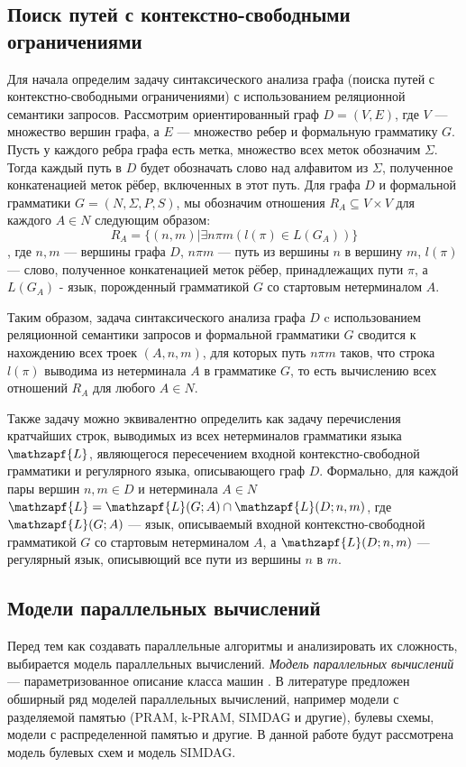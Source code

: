 \documentclass{spbau-diploma}
\begin{document}
\subsection{Поиск путей с контекстно-свободными ограничениями}
Для начала определим задачу синтаксического анализа графа (поиска путей с контекстно-свободными ограничениями) с
использованием реляционной семантики запросов.
Рассмотрим ориентированный граф $D = (V, E)$, где $V$ --- множество вершин графа, а $E$ --- множество ребер и
формальную грамматику $G$. Пусть у каждого ребра графа есть
метка, множество всех меток обозначим $\Sigma$. Тогда каждый путь в
$D$ будет обозначать слово над алфавитом из $\Sigma$, полученное
конкатенацией меток рёбер, включенных в этот путь.
Для графа $D$ и формальной грамматики $G = (N, \Sigma, P, S)$, мы
обозначим отношения $R_A \subseteq V\times V$ для каждого $A \in N$ следующим
образом:
\begin{equation}
R_A = \{(n, m) | \exists n\pi m(l(\pi) \in L(G_A)) \}
\end{equation},
где $n, m$ --- вершины графа $D$, $n\pi m$ --- путь из вершины $n$ в вершину $m$, $l(\pi)$ --- слово, полученное
конкатенацией меток рёбер, принадлежащих пути $\pi$, а $L(G_A)$ - язык, порожденный грамматикой $G$ со стартовым нетерминалом $A$.\par
Таким образом, задача синтаксического анализа графа $D$ c
использованием реляционной семантики запросов и формальной
грамматики $G$ сводится к нахождению всех троек $(A, n, m)$, для
которых путь $n\pi m$ таков, что строка $l(\pi)$ выводима из нетерминала
$A$ в грамматике $G$, то есть вычислению всех отношений $R_A$ для
любого $A \in N$.\par
Также задачу можно эквивалентно определить как задачу перечисления кратчайших строк, выводимых из всех нетерминалов грамматики языка $\mathzapf{L}$, являющегося пересечением входной контекстно-свободной грамматики и регулярного языка, описывающего граф $D$. Формально, для каждой пары вершин $n, m \in D$ и нетерминала $A \in N$ $\mathzapf{L} = \mathzapf{L}(G; A) \cap  \mathzapf{L}(D; n, m)$, где $\mathzapf{L}(G; A)$  --- язык, описываемый входной контекстно-свободной грамматикой $G$ со стартовым нетерминалом $A$, а $\mathzapf{L}(D; n, m)$ --- регулярный язык, описывющий все пути из вершины $n$ в $m$.

\subsection{Модели параллельных вычислений}
Перед тем как создавать параллельные алгоритмы и анализировать их сложность, выбирается модель параллельных вычислений. \textit{Модель параллельных вычислений} --- параметризованное описание класса машин \cite{PCompl}. В литературе предложен обширный ряд моделей параллельных вычислений, например модели с разделяемой памятью (PRAM, k-PRAM, SIMDAG и другие), булевы схемы, модели с распределенной памятью и другие. В данной работе будут рассмотрена модель булевых схем и модель SIMDAG. 
\end{document}
